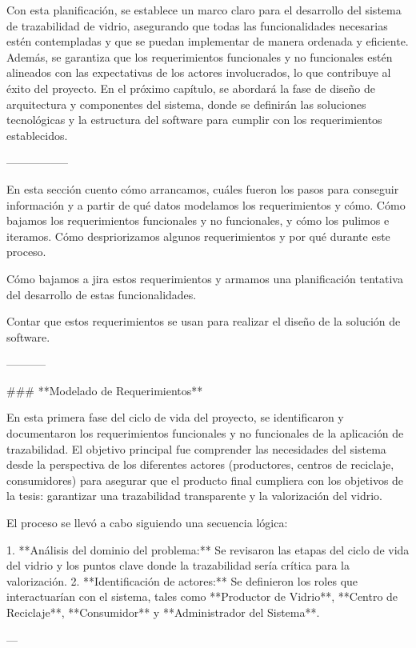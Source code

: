 Con esta planificación, se establece un marco claro para el desarrollo del sistema de trazabilidad de vidrio, asegurando que todas las funcionalidades necesarias estén contempladas y que se puedan implementar de manera ordenada y eficiente. Además, se garantiza que los requerimientos funcionales y no funcionales estén alineados con las expectativas de los actores involucrados, lo que contribuye al éxito del proyecto. En el próximo capítulo, se abordará la fase de diseño de arquitectura y componentes del sistema, donde se definirán las soluciones tecnológicas y la estructura del software para cumplir con los requerimientos establecidos.

-----------------

En esta sección cuento cómo arrancamos, cuáles fueron los pasos para conseguir información y a partir de qué datos modelamos los requerimientos y cómo. Cómo bajamos los requerimientos funcionales y no funcionales, y cómo los pulimos e iteramos. Cómo despriorizamos algunos requerimientos y por qué durante este proceso.

Cómo bajamos a jira estos requerimientos y armamos una planificación tentativa del desarrollo de estas funcionalidades.

Contar que estos requerimientos se usan para realizar el diseño de la solución de software.

-----------

### **Modelado de Requerimientos**

En esta primera fase del ciclo de vida del proyecto, se identificaron y documentaron los requerimientos funcionales y no funcionales de la aplicación de trazabilidad. El objetivo principal fue comprender las necesidades del sistema desde la perspectiva de los diferentes actores (productores, centros de reciclaje, consumidores) para asegurar que el producto final cumpliera con los objetivos de la tesis: garantizar una trazabilidad transparente y la valorización del vidrio.

El proceso se llevó a cabo siguiendo una secuencia lógica:

1.  **Análisis del dominio del problema:** Se revisaron las etapas del ciclo de vida del vidrio y los puntos clave donde la trazabilidad sería crítica para la valorización.
2.  **Identificación de actores:** Se definieron los roles que interactuarían con el sistema, tales como **Productor de Vidrio**, **Centro de Reciclaje**, **Consumidor** y **Administrador del Sistema**.

---

